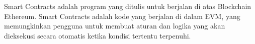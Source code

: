 Smart Contracts adalah program yang ditulis untuk berjalan di atas Blockchain Ethereum. Smart Contracts adalah kode yang berjalan di dalam EVM, yang memungkinkan pengguna untuk membuat aturan dan logika yang akan dieksekusi secara otomatis ketika kondisi tertentu terpenuhi.


